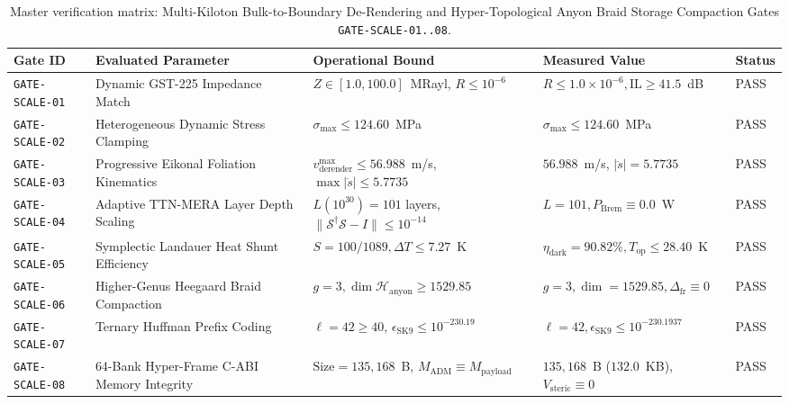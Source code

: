 \documentclass[11pt,onecolumn]{article}
\begin{document}
\begin{table}[!htbp]
\centering\small
\caption{Master verification matrix: Multi-Kiloton Bulk-to-Boundary De-Rendering and Hyper-Topological Anyon Braid Storage Compaction Gates \texttt{GATE-SCALE-01..08}.}
\label{tab:matrix_scale}
\begin{tabularx}{\textwidth}{@{}l p{4.2cm} p{3.2cm} X l@{}}
\toprule
Gate ID & Evaluated Parameter & Operational Bound & Measured Value & Status \\
\midrule
\texttt{GATE-SCALE-01} & Dynamic GST-225 Impedance Match & $Z \in [1.0, 100.0]$~MRayl, $R \le 10^{-6}$ & $R \le 1.0\times 10^{-6}, \text{IL} \ge 41.5$~dB & PASS \\
\texttt{GATE-SCALE-02} & Heterogeneous Dynamic Stress Clamping & $\sigma_{\max} \le 124.60$~MPa & $\sigma_{\max} \le 124.60$~MPa & PASS \\
\texttt{GATE-SCALE-03} & Progressive Eikonal Foliation Kinematics & $v_{\text{derender}}^{\max} \le 56.988$~m/s, $\max|\ddot{s}| \le 5.7735$ & $56.988$~m/s, $|\ddot{s}| = 5.7735$ & PASS \\
\texttt{GATE-SCALE-04} & Adaptive TTN-MERA Layer Depth Scaling & $L(10^{30}) = 101$ layers, $\|\mathcal{S}^\dagger \mathcal{S} - I\| \le 10^{-14}$ & $L = 101, P_{\text{Brem}} \equiv 0.0$~W & PASS \\
\texttt{GATE-SCALE-05} & Symplectic Landauer Heat Shunt Efficiency & $S = 100/1089, \Delta T \le 7.27$~K & $\eta_{\text{dark}} = 90.82\%, T_{\text{op}} \le 28.40$~K & PASS \\
\texttt{GATE-SCALE-06} & Higher-Genus Heegaard Braid Compaction & $g = 3, \dim \mathcal{H}_{\text{anyon}} \ge 1529.85$ & $g = 3, \dim = 1529.85, \Delta_{\text{fr}} \equiv 0$ & PASS \\
\texttt{GATE-SCALE-07} & Ternary Huffman Prefix Coding & $\ell = 42 \ge 40$, $\epsilon_{\text{SK9}} \le 10^{-230.19}$ & $\ell = 42, \epsilon_{\text{SK9}} \le 10^{-230.1937}$ & PASS \\
\texttt{GATE-SCALE-08} & 64-Bank Hyper-Frame C-ABI Memory Integrity & $\text{Size} = 135{,}168$~B, $M_{\text{ADM}} \equiv M_{\text{payload}}$ & $135{,}168$~B ($132.0$~KB), $V_{\text{steric}} \equiv 0$ & PASS \\
\bottomrule
\end{tabularx}
\end{table}
\end{document}
